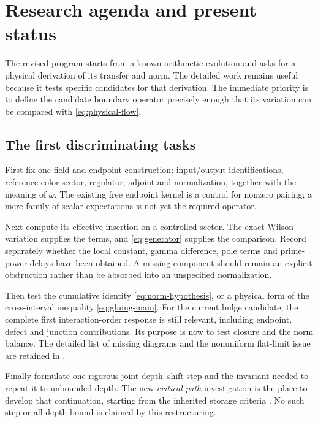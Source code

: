 \section{Research agenda and present status}\label{sec:outlook}

The revised program starts from a known arithmetic evolution and
asks for a physical derivation of its transfer and norm. The
detailed work remains useful because it tests specific candidates
for that derivation. The immediate priority is to define the
candidate boundary operator precisely enough that its variation
can be compared with \eqref{eq:physical-flow}.

\subsection{The first discriminating tasks}

First fix one field and endpoint construction: input/output
identifications, reference color sector, regulator, adjoint and
normalization, together with the meaning of $\omega$.
The existing free endpoint kernel is a control for nonzero pairing;
a mere family of scalar expectations is not yet the required
operator.

Next compute its effective insertion on a controlled sector.
The exact Wilson variation supplies the terms, and
\eqref{eq:generator} supplies the comparison. Record separately
whether the local constant, gamma difference, pole terms and
prime-power delays have been obtained. A missing component should
remain an explicit obstruction rather than be absorbed into an
unspecified normalization.

Then test the cumulative identity
\eqref{eq:norm-hypothesis}, or a physical form of the cross-interval
inequality \eqref{eq:gluing-main}. For the current bulge candidate,
the complete first interaction-order response is still relevant,
including endpoint, defect and junction contributions. Its purpose
is now to test closure and the norm balance. The detailed list of
missing diagrams and the nonuniform flat-limit issue are retained
in \cite[Section~S8.4]{Supplement}.

Finally formulate one rigorous joint depth--shift step and the
invariant needed to repeat it to unbounded depth. The new
\emph{critical-path} investigation is the place to develop that
continuation, starting from the inherited storage criteria
\cite{ShiftFlowNote,CumulativePath}. No such step or all-depth
bound is claimed by this restructuring.

